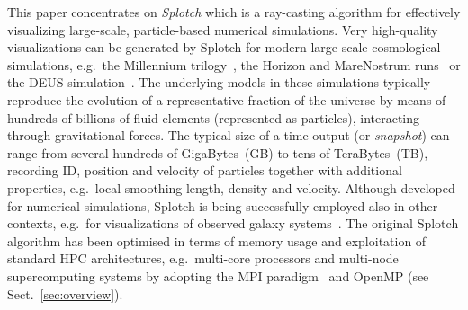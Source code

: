 \documentclass[preprint,5pt]{elsarticle}
\begin{document}
This paper concentrates on {\it Splotch} \cite{2008NJPh...10l5006D} \cite{splotch-web} which is a ray-casting algorithm for effectively visualizing large-scale, particle-based numerical simulations. Very high-quality visualizations can be generated by Splotch for modern large-scale cosmological simulations, e.g.\ the Millennium trilogy~\cite{millennium}, the Horizon and MareNostrum runs~\cite{horizon} or the DEUS simulation~\cite{deus}. The underlying models in these simulations typically reproduce the evolution of a representative fraction of the universe by means of hundreds of billions of fluid elements (represented as particles), interacting through gravitational forces. The typical size of a time output (or {\it snapshot}) can range from several hundreds of GigaBytes~(GB) to tens of TeraBytes~(TB), recording ID, position and velocity of particles together with additional properties, e.g.\ local smoothing length, density and velocity. Although developed for numerical simulations, Splotch is being successfully employed also in other contexts, e.g.\ for visualizations of observed galaxy systems~\cite{m83-vis}.
The original Splotch algorithm has been optimised in terms of memory usage and exploitation of standard HPC architectures, e.g.\ multi-core processors and multi-node supercomputing systems by adopting the MPI paradigm~\cite{jin:high-performance} and OpenMP (see Sect.~\ref{sec:overview}).
\end{document}
